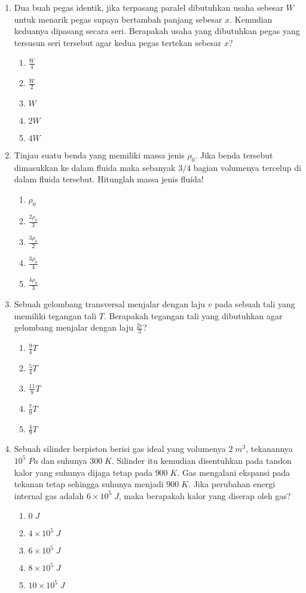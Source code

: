 \documentclass[A4,12PT, english, twocolumn]{journal}
\begin{document}
\begin{enumerate}
\item Dua buah pegas identik, jika terpasang paralel dibutuhkan usaha sebesar $W$ untuk menarik pegas supaya bertambah panjang sebesar $x$. Kemudian keduanya dipasang secara seri. Berapakah usaha yang dibutuhkan pegas yang tersusun seri tersebut agar kedua pegas tertekan sebesar $x$?
    \begin{enumerate}
        \item $\frac{W}{4}$
        \item $\frac{W}{2}$
        \item $W$
        \item $2W$
        \item $4W$
    \end{enumerate}

\item Tinjau suatu benda yang memiliki massa jenis $\rho_{0}$. Jika benda tersebut dimasukkan ke dalam fluida maka sebanyak $3/4$ bagian volumenya tercelup di dalam fluida tersebut. Hitunglah massa jenis fluida!
    \begin{enumerate}
        \item $\rho_{0}$
        \item $\frac{2\rho_{0}}{3}$
        \item $\frac{3\rho_{0}}{2}$
        \item $\frac{3\rho_{0}}{4}$
        \item $\frac{4\rho_{0}}{3}$
    \end{enumerate}
    
\item Sebuah gelombang transversal menjalar dengan laju $v$ pada sebuah tali yang memiliki tegangan tali $T$. Berapakah tegangan tali yang dibutuhkan agar gelombang menjalar dengan laju $\frac{2v}{3}$?
    \begin{enumerate}
        \item $\frac{9}{4}T$
        \item $\frac{5}{4}T$
        \item $\frac{11}{9}T$
        \item $\frac{7}{9}T$
        \item $\frac{4}{9}T$
    \end{enumerate}
    
\item Sebuah silinder berpiston berisi gas ideal yang volumenya $2 \; m^3$, tekanannya $10^5 \; Pa$ dan suhunya $300 \; K$. Silinder itu kemudian disentuhkan pada tandon kalor yang suhunya dijaga tetap pada $900 \; K$. Gas mengalani ekspansi pada tekanan tetap sehingga suhunya menjadi $900 \; K$. Jika perubahan energi internal gas adalah $6 \times 10^5 \; J$, maka berapakah kalor yang diserap oleh gas?
    \begin{enumerate}
        \item $0 \; J$
        \item $4 \times 10^5 \; J$
        \item $6 \times 10^5 \; J$
        \item $8 \times 10^5 \; J$
        \item $10 \times 10^5 \; J$
    \end{enumerate}
    

\end{enumerate}
\end{document}
